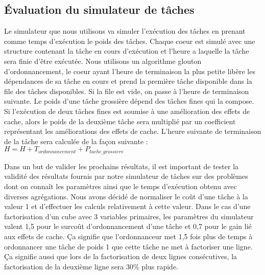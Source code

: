 \subsection{\'Evaluation du simulateur de tâches}
Le simulateur que nous utilisons va simuler l'exécution des tâches en prenant comme temps d'exécution le poids des tâches.
%
Chaque coeur est simulé avec une structure contenant la tâche en cours d'exécution et l'heure a laquelle la tâche sera finie d'être exécutée.
%
Nous utilisons un algorithme glouton d'ordonnancement, le coeur ayant l'heure de terminaison la plus petite libère les dépendances de sa tâche en cours et prend la première tâche disponible dans la file des tâches disponibles.
%
Si la file est vide, on passe à l'heure de terminaison suivante.
%
Le poids d'une tâche grossière dépend des tâches fines qui la compose.
%
Si l'exécution de deux tâches fines est soumise à une amélioration des effets de cache, alors le poids de la deuxième tâche sera multiplié par un coefficient représentant les améliorations des effets de cache.
%
L'heure suivante de terminaison de la tâche sera calculée de la façon suivante : $H = H + T_{ordonnancement} + P_{tache\_grossiere}$



Dans un but de valider les prochains résultats, il est important de tester la validité des résultats fournis par notre simulateur de tâches sur des problèmes dont on connaît les paramètres ainsi que le temps d'exécution obtenu avec diverses agrégations.
%
Nous avons décidé de normaliser le coût d'une tâche à la valeur 1 et d'effectuer les calculs relativement à cette valeur.
%
Dans le cas d'une factorisation d'un cube avec 3 variables primaires, les paramètres du simulateur valent 1,5 pour le surcoût d'ordonnancement d'une tâche et 0,7 pour le gain lié aux effets de cache.
%
Ça signifie que l'ordonnanceur met 1,5 fois plus de temps à ordonnancer une tâche de poids 1 que cette tâche ne met à factoriser une ligne.
%
Ça signifie aussi que lors de la factorisation de deux lignes consécutives, la factorisation de la deuxième ligne sera 30\% plus rapide.

